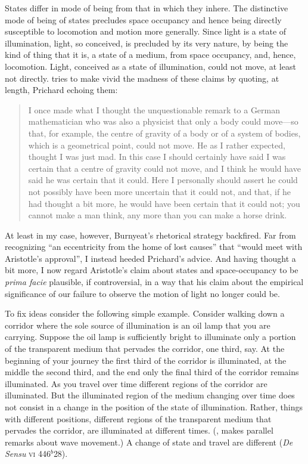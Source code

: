 States differ in mode of being from that in which they inhere. The distinctive mode of being of states precludes space occupancy and hence being directly susceptible to locomotion and motion more generally. Since light is a state of illumination, light, so conceived, is precluded by its very nature, by being the kind of thing that it is, a state of a medium, from space occupancy, and, hence, locomotion. Light, conceived as a state of illumination, could not move, at least not directly. \citet[430 n29; appendix]{Burnyeat:1995fk} tries to make vivid the madness of these claims by quoting, at length, Prichard echoing them:
\begin{quote}
	I once made what I thought the unquestionable remark to a German mathematician who was also a physicist that only a body could move---so that, for example, the centre of gravity of a body or of a system of bodies, which is a geometrical point, could not move. He as I rather expected, thought I was just mad. In this case I should certainly have said I was certain that a centre of gravity could not move, and I think he would have said he was certain that it could. Here I personally should assert he could not possibly have been more uncertain that it could not, and that, if he had thought a bit more, he would have been certain that it could not; you cannot make a man think, any more than you can make a horse drink. \citep[99; this is just the initial paragraph of the material that Burnyeat quotes]{Prichard:1950tg}
\end{quote}
At least in my case, however, Burnyeat's \citeyearpar[430 n29]{Burnyeat:1995fk} rhetorical strategy backfired. Far from recognizing ``an eccentricity from the home of lost causes'' that ``would meet with Aristotle's approval'', I instead heeded Prichard's advice. And having thought a bit more, I now regard Aristotle's claim about states and space-occupancy to be \emph{prima facie} plausible, if controversial, in a way that his claim about the empirical significance of our failure to observe the motion of light no longer could be.

To fix ideas consider the following simple example. Consider walking down a corridor where the sole source of illumination is an oil lamp that you are carrying. Suppose the oil lamp is sufficiently bright to illuminate only a portion of the transparent medium that pervades the corridor, one third, say. At the beginning of your journey the first third of the corridor is illuminated, at the middle the second third, and the end only the final third of the corridor remains illuminated. As you travel over time different regions of the corridor are illuminated. But the illuminated region of the medium changing over time does not consist in a change in the position of the state of illumination. Rather, things with different positions, different regions of the transparent medium that pervades the corridor, are illuminated at different times. (\citealt[99]{Prichard:1950tg}, makes parallel remarks about wave movement.) A change of state and travel are different (\emph{De Sensu} \textsc{vi} 446\( ^{b} \)28).

